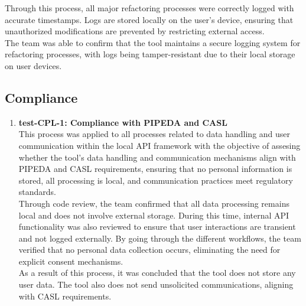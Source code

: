 \documentclass[12pt, titlepage]{article}
\begin{document}
\noindent Through this process, all major refactoring processes were
correctly logged with accurate timestamps. Logs are stored locally on
the user's device, ensuring that unauthorized modifications are
prevented by restricting external access.\\

\noindent The team was able to confirm that the tool maintains a
secure logging system for refactoring processes, with logs being
tamper-resistant due to their local storage on user devices.

\subsection{Compliance}
\begin{enumerate}

  \item \textbf{test-CPL-1: Compliance with PIPEDA and CASL} \\[2mm]
    This process was applied to all processes related to data
    handling and user communication within the local API framework
    with the objective of assesing whether the tool's data handling
    and communication mechanisms align with PIPEDA and CASL
    requirements, ensuring that no personal information is stored,
    all processing is local, and communication practices meet
    regulatory standards.\\
    \noindent Through code review, the team confirmed that all data
    processing remains local and does not involve external storage.
    During this time, internal API functionality was also reviewed to
    ensure that user interactions are transient and not logged
    externally. By going through the different workflows, the team
    verified that no personal data collection occurs, eliminating the
    need for explicit consent mechanisms.\\
    \noindent As a result of this process, it was concluded that the
    tool does not store any user data. The tool also does not send
    unsolicited communications, aligning with CASL requirements.


\end{enumerate}
\end{document}
